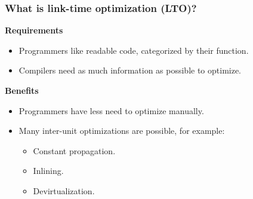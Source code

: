 \documentclass{beamer}
\begin{document}
\begin{frame}[t]
\end{frame}

\begin{frame}[t]
\frametitle{What is link-time optimization (LTO)?}
\textbf{Requirements}
\begin{itemize}
	\item Programmers like readable code, categorized by their function.
	\item Compilers need as much information as possible to optimize.
\end{itemize}
\pause
\vfill
\textbf{Benefits} 
\begin{itemize}
	\item Programmers have less need to optimize manually.
	\item Many inter-unit optimizations are possible, for example:
		\begin{itemize}
			\item Constant propagation.
			\item Inlining.
			\item Devirtualization.
		\end{itemize}
\end{itemize}
\end{frame}


\end{document}
